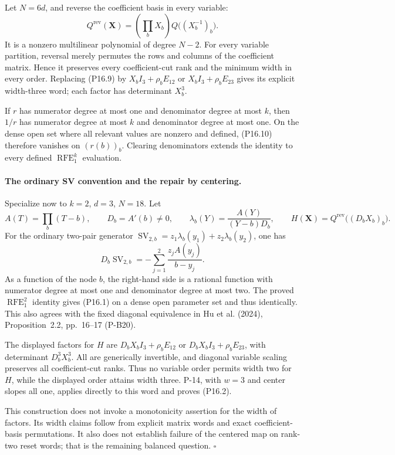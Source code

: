 Let $N=6d$, and reverse the coefficient basis in every variable:
\[
 Q^{\mathrm{rev}}(\mathbf X)=
       \left(\prod_bX_b\right)Q\bigl((X_b^{-1})_b\bigr).
 \tag{P16.10}
\]
It is a nonzero multilinear polynomial of degree $N-2$. For every
variable partition, reversal merely permutes the rows and columns
of the coefficient matrix. Hence it preserves every coefficient-cut
rank and the minimum width in every order. Replacing (P16.9) by
$X_bI_3+\rho_bE_{12}$ or $X_bI_3+\rho_bE_{23}$ gives its explicit
width-three word; each factor has determinant $X_b^3$.

If $r$ has numerator degree at most one and denominator degree at
most $k$, then $1/r$ has numerator degree at most $k$ and denominator
degree at most one. On the dense open set where all relevant values
are nonzero and defined, (P16.10) therefore vanishes on $(r(b))_b$.
Clearing denominators extends the identity to every defined
$\operatorname{RFE}_{1}^{k}$ evaluation.

\paragraph{The ordinary SV convention and the repair by centering.}
Specialize now to $k=2$, $d=3$, $N=18$. Let
\[
 A(T)=\prod_b(T-b),\qquad D_b=A'(b)\ne0,
 \qquad \lambda_b(Y)=\frac{A(Y)}{(Y-b)D_b},
 \qquad H(\mathbf X)=Q^{\mathrm{rev}}\bigl((D_bX_b)_b\bigr).
 \tag{P16.11}
\]
For the ordinary two-pair generator
$\operatorname{SV}_{2,b}=z_1\lambda_b(y_1)+z_2\lambda_b(y_2)$, one has
\[
 D_b\operatorname{SV}_{2,b}
   =-\sum_{j=1}^{2}\frac{z_jA(y_j)}{b-y_j}.
 \tag{P16.12}
\]
As a function of the node $b$, the right-hand side is a rational
function with numerator degree at most one and denominator degree
at most two. The proved $\operatorname{RFE}_{1}^{2}$ identity gives
(P16.1) on a dense open parameter set and thus identically. This
also agrees with the fixed diagonal equivalence in Hu et al. (2024),
Proposition~2.2, pp.~16--17 (P-B20).

The displayed factors for $H$ are
$D_bX_bI_3+\rho_bE_{12}$ or $D_bX_bI_3+\rho_bE_{23}$, with determinant
$D_b^3X_b^3$. All are generically invertible, and diagonal variable
scaling preserves all coefficient-cut ranks. Thus no variable order permits width two for $H$, while the displayed
order attains width three. P-14, with $w=3$ and center slopes
all one, applies directly to this word and proves (P16.2).

This construction does not invoke a monotonicity assertion for the
width of factors. Its width claims follow from explicit matrix words
and exact coefficient-basis permutations. It also does not establish
failure of the centered map on rank-two reset words; that is the
remaining balanced question.
\hfill$\square$

